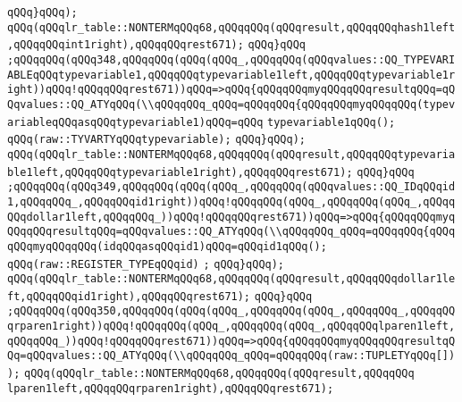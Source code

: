 \verb|qQQq}qQQq);|\newline
\verb|qQQq(qQQqlr_table::NONTERMqQQq68,qQQqqQQq(qQQqresult,qQQqqQQqhash1left,qQQqqQQqint1right),qQQqqQQqrest671);|\newline
\verb|qQQq}qQQq|\newline
\verb|;qQQqqQQq(qQQq348,qQQqqQQq(qQQq(qQQq_,qQQqqQQq(qQQqvalues::QQ_TYPEVARIABLEqQQqtypevariable1,qQQqqQQqtypevariable1left,qQQqqQQqtypevariable1right))qQQq!qQQqqQQqrest671))qQQq=>qQQq{qQQqqQQqmyqQQqqQQqresultqQQq=qQQqvalues::QQ_ATYqQQq(\\qQQqqQQq_qQQq=qQQqqQQq{qQQqqQQqmyqQQqqQQq(typevariableqQQqasqQQqtypevariable1)qQQq=qQQq|\newline
\verb|typevariable1qQQq();|\newline
\verb|qQQq(raw::TYVARTYqQQqtypevariable);|\newline
\verb|qQQq}qQQq);|\newline
\verb|qQQq(qQQqlr_table::NONTERMqQQq68,qQQqqQQq(qQQqresult,qQQqqQQqtypevariable1left,qQQqqQQqtypevariable1right),qQQqqQQqrest671);|\newline
\verb|qQQq}qQQq|\newline
\verb|;qQQqqQQq(qQQq349,qQQqqQQq(qQQq(qQQq_,qQQqqQQq(qQQqvalues::QQ_IDqQQqid1,qQQqqQQq_,qQQqqQQqid1right))qQQq!qQQqqQQq(qQQq_,qQQqqQQq(qQQq_,qQQqqQQqdollar1left,qQQqqQQq_))qQQq!qQQqqQQqrest671))qQQq=>qQQq{qQQqqQQqmyqQQqqQQqresultqQQq=qQQqvalues::QQ_ATYqQQq(\\qQQqqQQq_qQQq=qQQqqQQq{qQQqqQQqmyqQQqqQQq(idqQQqasqQQqid1)qQQq=qQQqid1qQQq();|\newline
\verb|qQQq(raw::REGISTER_TYPEqQQqid)|\newline
\verb|;|\newline
\verb|qQQq}qQQq);|\newline
\verb|qQQq(qQQqlr_table::NONTERMqQQq68,qQQqqQQq(qQQqresult,qQQqqQQqdollar1left,qQQqqQQqid1right),qQQqqQQqrest671);|\newline
\verb|qQQq}qQQq|\newline
\verb|;qQQqqQQq(qQQq350,qQQqqQQq(qQQq(qQQq_,qQQqqQQq(qQQq_,qQQqqQQq_,qQQqqQQqrparen1right))qQQq!qQQqqQQq(qQQq_,qQQqqQQq(qQQq_,qQQqqQQqlparen1left,qQQqqQQq_))qQQq!qQQqqQQqrest671))qQQq=>qQQq{qQQqqQQqmyqQQqqQQqresultqQQq=qQQqvalues::QQ_ATYqQQq(\\qQQqqQQq_qQQq=qQQqqQQq(raw::TUPLETYqQQq[]));|\newline
\verb|qQQq(qQQqlr_table::NONTERMqQQq68,qQQqqQQq(qQQqresult,qQQqqQQq|\newline
\verb|lparen1left,qQQqqQQqrparen1right),qQQqqQQqrest671);|\newline
